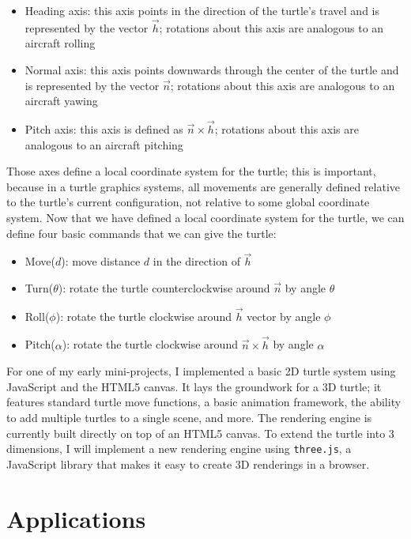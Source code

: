 \documentclass[12pt]{article}
\begin{document}
\begin{itemize}
\item Heading axis: this axis points in the direction of the turtle's travel and is represented by the vector $\vec{h}$; rotations about this axis are analogous to an aircraft rolling
\item Normal axis: this axis points downwards through the center of the turtle and is represented by the vector $\vec{n}$; rotations about this axis are analogous to an aircraft yawing
\item Pitch axis: this axis is defined as $\vec{n} \times \vec{h}$; rotations about this axis are analogous to an aircraft pitching
\end{itemize}

Those axes define a local coordinate system for the turtle; this is important, because in a turtle graphics systems, all movements are generally defined relative to the turtle's current configuration, not relative to some global coordinate system. Now that we have defined a local coordinate system for the turtle, we can define four basic commands that we can give the turtle:

\begin{itemize}
\item Move($d$): move distance $d$ in the direction of $\vec{h}$
\item Turn($\theta$): rotate the turtle counterclockwise around $\vec{n}$ by angle $\theta$
\item Roll($\phi$): rotate the turtle clockwise around $\vec{h}$ vector by angle $\phi$
\item Pitch($\alpha$): rotate the turtle clockwise around $\vec{n} \times \vec{h}$ by angle  $\alpha$
\end{itemize}

For one of my early mini-projects, I implemented a basic 2D turtle system using JavaScript and the HTML5 canvas. It lays the groundwork for a 3D turtle; it features standard turtle move functions, a basic animation framework, the ability to add multiple turtles to a single scene, and more. The rendering engine is currently built directly on top of an HTML5 canvas. To extend the turtle into 3 dimensions, I will implement a new rendering engine using \texttt{three.js}, a JavaScript library that makes it easy to create 3D renderings in a browser.

\section{Applications}
\end{document}
